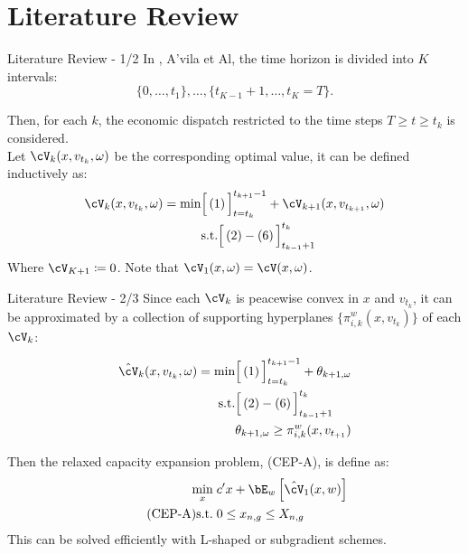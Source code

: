

\section{Literature Review}

\begin{frame}{Literature Review - 1/2}
  In \cite{DecompAlg}, A'vila et Al, the time horizon is divided  into \(K\) intervals: \\ 
   \pause \[\{0,\ldots, t_{1}\}, \ldots,\{t_{K-1}+1,\ldots,t_K = T\}.\] \pause
  
  Then, for each \(k\), the economic dispatch restricted to the time steps \(T \geq t \geq  t_k\) is considered. \pause \\
  \vspace{0.5cm}
  Let  \(\cV_k(x,v_{t_k},\omega)\) be the corresponding optimal value, it can be defined inductively as: \pause\\

  \begin{alignat}{2}
    \cV_k(x,v_{t_k},\omega) = \min & \Bigl[\, (1)\, \Bigr]_{t = t_k}^{t_{k+1}-1} +  \cV_{k+1}(x,v_{t_{k+1}},\omega) \nonumber \\
    & \text{s.t.} \Bigl[\, (2)-(6)\, \Bigr]_{t_{k-1}+1}^{t_k} \nonumber
  \end{alignat}
  \pause
  Where \(\cV_{K+1} \coloneqq 0\). \pause Note that \(\cV_1(x,\omega) = \cV(x, \omega)\). \pause \\
  


\end{frame}

\begin{frame}{Literature Review - 2/3}
  Since each \(\cV_k\) is peacewise convex in \(x\) and \(v_{t_k}\), it can be approximated by a collection of supporting hyperplanes \(\{\pi^w_{i,k}(x,v_{t_k})\}\) of each \(\cV_k\): \pause

  \begin{alignat}{2}
    \hat{\cV}_k(x,v_{t_k},\omega) = \min & \Bigl[\, (1)\, \Bigr]_{t = t_k}^{t_{k+1}-1} +  \theta_{k+1,\omega} \nonumber \\
    \text{s.t.} & \Bigl[\, (2)-(6)\, \Bigr]_{t_{k-1}+1}^{t_k} \nonumber \\
         & \theta_{k+1,\omega} \geq \pi^w_{i,k}(x,v_{t_{+1}}) \nonumber
  \end{alignat}

  \pause

  Then the relaxed capacity expansion problem, (CEP-A), is define as:
\pause
  \begin{align*}
    \label{CEP-A}
    \min_{x} \; & c'x + \bE_w\left[\hat{\cV}_1(x,w)\right] \\  \tag{CEP-A}
    \text{s.t.} \;     & 0 \leq x_{n,g} \leq X_{n,g}
  \end{align*}
\pause
  This can be solved efficiently with L-shaped or subgradient schemes.
\end{frame}

